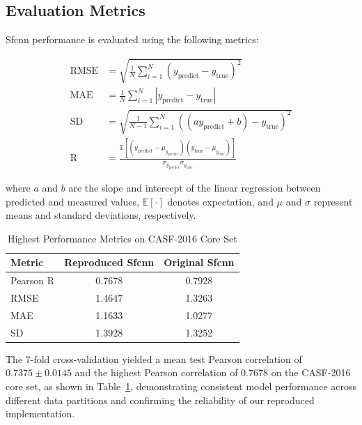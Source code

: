 \documentclass[unnumsec,webpdf,contemporary,large]{oup-authoring-template}
\theoremstyle{thmstyleone}%
\theoremstyle{thmstyletwo}%
\theoremstyle{thmstylethree}%
\begin{document}
\subsection{Evaluation Metrics}
Sfcnn performance is evaluated using the following metrics:

\begin{align*}
\mathrm{RMSE} &= \sqrt{\frac{1}{N} \sum_{i=1}^{N} (y_{\text{predict}} - y_{\text{true}})^2} \\
\mathrm{MAE} &= \frac{1}{N} \sum_{i=1}^{N} |y_{\text{predict}} - y_{\text{true}}| \\
\mathrm{SD} &= \sqrt{\frac{1}{N-1} \sum_{i=1}^{N} ((a y_{\text{predict}} + b) - y_{\text{true}})^2} \\
\mathrm{R} &= \frac{\mathbb{E}[(y_{\text{predict}} - \mu_{y_{\text{predict}}})(y_{\text{true}} - \mu_{y_{\text{true}}})]}{\sigma_{y_{\text{predict}}} \sigma_{y_{\text{true}}}}
\end{align*}

where $a$ and $b$ are the slope and intercept of the linear regression between predicted and measured values, $\mathbb{E}[\cdot]$ denotes expectation, and $\mu$ and $\sigma$ represent means and standard deviations, respectively.

\begin{table}[H]
\centering
\caption{Highest Performance Metrics on CASF-2016 Core Set}
\label{tab:metrics}
\begin{tabular}{lcc}
\toprule
Metric & Reproduced Sfcnn & Original Sfcnn \\
\midrule
Pearson R & 0.7678 & 0.7928 \\
RMSE & 1.4647 & 1.3263 \\
MAE & 1.1633 & 1.0277 \\
SD & 1.3928 & 1.3252 \\
\bottomrule
\end{tabular}
\end{table}

The 7-fold cross-validation yielded a mean test Pearson correlation of $0.7375 \pm 0.0145$ and
the highest Pearson correlation of $0.7678$ on the CASF-2016 core set, as shown in Table~\ref{tab:metrics},
demonstrating consistent model performance across different data partitions and confirming the reliability of our reproduced implementation.
\end{document}
